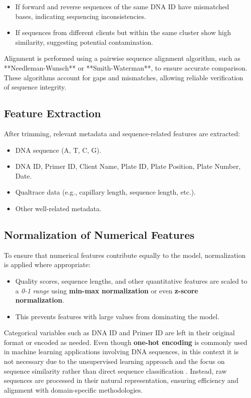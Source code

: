 \begin{itemize}
    \item If forward and reverse sequences of the same DNA ID have mismatched bases, indicating sequencing inconsistencies.
    \item If sequences from different clients but within the same cluster show high similarity, suggesting potential contamination.
\end{itemize}

Alignment is performed using a pairwise sequence alignment algorithm, such as **Needleman-Wunsch** or **Smith-Waterman**, to ensure accurate comparison. These algorithms account for gaps and mismatches, allowing reliable verification of sequence integrity.

\subsection{Feature Extraction}
After trimming, relevant metadata and sequence-related features are extracted:

\begin{itemize}
    \item DNA sequence (A, T, C, G).
    \item DNA ID, Primer ID, Client Name, Plate ID, Plate Position, Plate Number, Date.
    \item Qualtrace data (e.g., capillary length, sequence length, etc.).
    \item Other well-related metadata.
\end{itemize}

\subsection{Normalization of Numerical Features}
To ensure that numerical features contribute equally to the model, normalization is applied where appropriate:

\begin{itemize}
    \item Quality scores, sequence lengths, and other quantitative features are scaled to a \textit{0-1 range} using \textbf{min-max normalization} or even \textbf{z-score normalization}.
    \item This prevents features with large values from dominating the model.
\end{itemize}

Categorical variables such as DNA ID and Primer ID are left in their original format or encoded as needed.
Even though \textbf{one-hot encoding} is commonly used in machine learning applications involving DNA sequences, in this context it is not necessary due to the unsupervised learning approach and the focus on sequence similarity rather than direct sequence classification \cite{bonat2023}. Instead, raw sequences are processed in their natural representation, ensuring efficiency and alignment with domain-specific methodologies.

